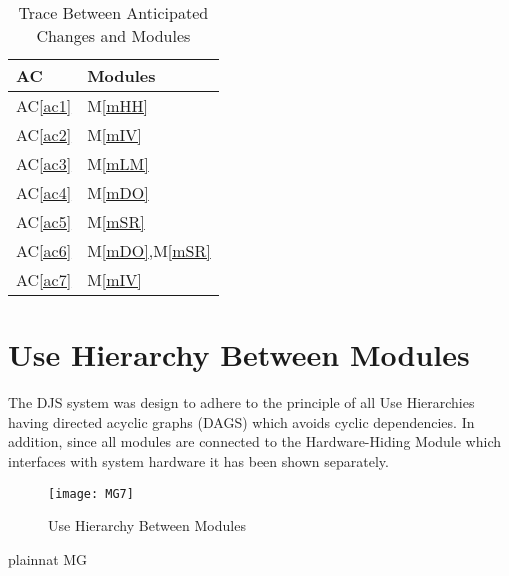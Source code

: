 \documentclass[12pt, titlepage]{article}
\newcommand{\acref}[1]{AC\ref{#1}}
\newcommand{\mref}[1]{M\ref{#1}}
\begin{document}
\begin{table}[H]
\centering
\begin{tabular}{p{} p{}}
\toprule
\textbf{AC} & \textbf{Modules}\\
\midrule
\acref{ac1} & \mref{mHH}\\
\acref{ac2} & \mref{mIV}\\
\acref{ac3} & \mref{mLM}\\
\acref{ac4} & \mref{mDO}\\
\acref{ac5} & \mref{mSR}\\
\acref{ac6} & \mref{mDO},\mref{mSR}\\
\acref{ac7} & \mref{mIV}\\
\bottomrule
\end{tabular}
\caption{Trace Between Anticipated Changes and Modules}
\label{TblACT}
\end{table}


\section{Use Hierarchy Between Modules} \label{SecUse}


The DJS system was design to adhere to the principle of all Use Hierarchies having directed acyclic graphs (DAGS) which avoids cyclic dependencies. In addition, since all modules are connected to the Hardware-Hiding Module which interfaces with system hardware it has been shown separately.
\begin{figure}[H]
\centering
\texttt{[image: MG7]}
\caption{Use Hierarchy Between Modules}
\label{FigUH}
\end{figure}




 {plainnat}
 {MG}
\end{document}
